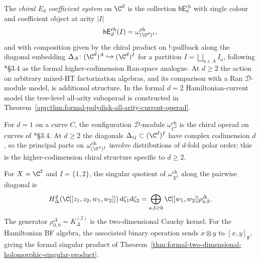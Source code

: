 \begin{defn}\label{app:defn:chiral-Ed-operad}
The \emph{chiral $E_d$ coefficient system} on $\C^d$ is the
collection \(\mathsf{hE}_d^{\mathrm{ch}}\) with single colour and
coefficient object at
arity $|I|$
\[
  \mathsf{hE}_d^{\mathrm{ch}}(I)
   =\omega^{\mathrm{ch}}_{(\C^d)^I},
\]
and with composition given by the chiral product on
\(!\)-pullback along the diagonal embedding
$\Delta_A\colon(\C^d)^A\hookrightarrow(\C^d)^I$ for a partition
$I=\bigsqcup_{a\in A}I_a$, following
\cite{beilinson-drinfeld-chiral}*{\S 3.4} as the formal
higher-codimension Ran-space analogue.  At \(d\geq2\) the action on
arbitrary mixed-HT factorization algebras, and its comparison with a
Ran \(\mathcal D\)-module model, is additional structure.  In the
formal \(d=2\) Hamiltonian-current model the tree-level all-arity
suboperad is constructed in
Theorem~\ref{app:thm:formal-polydisk-all-arity-current-operad}.
\end{defn}

\begin{rmk}[Comparison with curves at \texorpdfstring{$d=1$}{d=1}]\label{app:rmk:hEd-vs-BD-d1}
For $d=1$ on a curve $C$, the configuration $\mathcal D$-module
$\omega^{\mathrm{ch}}_{C^I}$ is the chiral operad on curves of
\cite{beilinson-drinfeld-chiral}*{\S 3.4}.  At $d\geq 2$ the diagonals
$\Delta_{ij}\subset(\C^d)^I$ have complex codimension $d$, so the
principal parts on $\omega^{\mathrm{ch}}_{(\C^d)^I}$ involve
distributions of $d$-fold polar order; this is the higher-codimension
chiral structure specific to \(d\geq2\).
\end{rmk}

\begin{rmk}[Arity two at \texorpdfstring{$d=2$}{d=2}]
For $X=\C^2$ and $I=\{1,2\}$, the singular quotient of
\(\omega^{\mathrm{ch}}_{X^I}\) along the pairwise diagonal is
\[
  H^2_\Delta(\C[[z_1,z_2,w_1,w_2]])\,d\zeta_1d\zeta_2
  =
  \bigoplus_{a,b\ge0}\C[[w_1,w_2]]\rho^\Delta_{a,b}.
\]
The generator \(\rho^\Delta_{0,0}=K^{(2)}_\Delta\) is the
two-dimensional Cauchy kernel.  For the Hamiltonian BF algebra, the
associated binary operation sends \(x\otimes y\) to
\([x,y]_{\mathfrak g}\), giving the formal singular product of
Theorem~\ref{thm:formal-two-dimensional-holomorphic-singular-product}.
\end{rmk}

